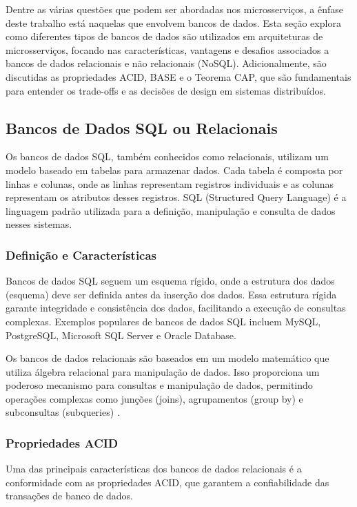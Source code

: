 Dentre as várias questões que podem ser abordadas nos microsserviços, a ênfase deste trabalho está naquelas que envolvem bancos de dados. Esta seção explora como diferentes tipos de bancos de dados são utilizados em arquiteturas de microsserviços, focando nas características, vantagens e desafios associados a bancos de dados relacionais e não relacionais (NoSQL). Adicionalmente, são discutidas as propriedades ACID, BASE e o Teorema CAP, que são fundamentais para entender os trade-offs e as decisões de design em sistemas distribuídos.

\subsection{Bancos de Dados SQL ou Relacionais}

Os bancos de dados SQL, também conhecidos como relacionais, utilizam um modelo baseado em tabelas para armazenar dados. Cada tabela é composta por linhas e colunas, onde as linhas representam registros individuais e as colunas representam os atributos desses registros. SQL (Structured Query Language) é a linguagem padrão utilizada para a definição, manipulação e consulta de dados nesses sistemas.

\subsubsection{Definição e Características}

Bancos de dados SQL seguem um esquema rígido, onde a estrutura dos dados (esquema) deve ser definida antes da inserção dos dados. Essa estrutura rígida garante integridade e consistência dos dados, facilitando a execução de consultas complexas. Exemplos populares de bancos de dados SQL incluem MySQL, PostgreSQL, Microsoft SQL Server e Oracle Database.


Os bancos de dados relacionais são baseados em um modelo matemático que utiliza álgebra relacional para manipulação de dados. Isso proporciona um poderoso mecanismo para consultas e manipulação de dados, permitindo operações complexas como junções (joins), agrupamentos (group by) e subconsultas (subqueries) \cite{codd1970}.

\subsubsection{Propriedades ACID}

Uma das principais características dos bancos de dados relacionais é a conformidade com as propriedades ACID, que garantem a confiabilidade das transações de banco de dados. 

